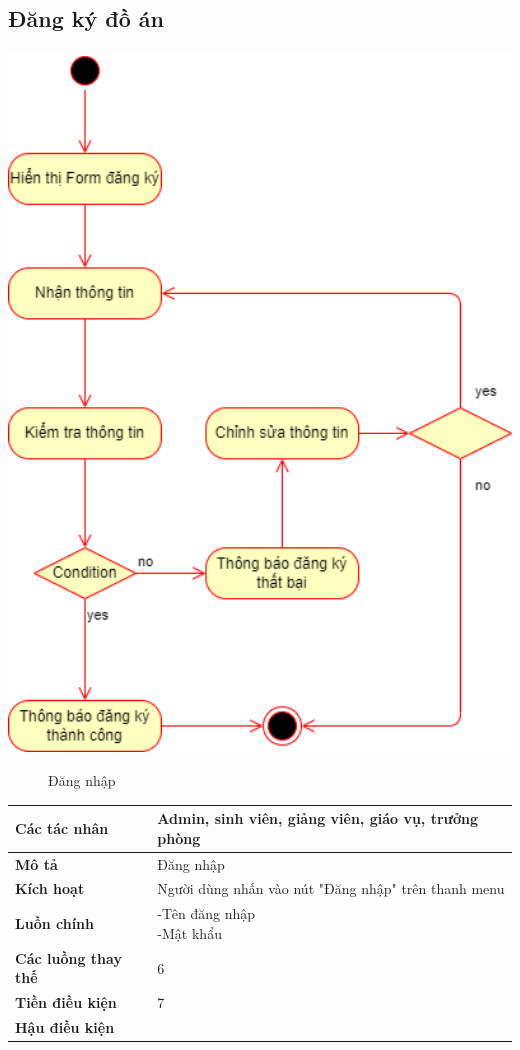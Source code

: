 \subsection{Đăng ký đồ án}
  \begin{center}
    \includegraphics[width=1.1\textwidth]{image/activity/register_doan.png}
    \begin{figure}
      \centering
      \caption{Đăng nhập}
    \end{figure}
  \end{center}
  \begin{table}
    \begin{tabular}{|l|l|}
      \hline
      \textbf{Các tác nhân} & Admin, sinh viên, giảng viên, giáo vụ, trưởng phòng \\
      \hline
      \textbf{Mô tả} & Đăng nhập\\
      \hline
      \textbf{Kích hoạt} & Người dùng nhấn vào nút "Đăng nhập" trên thanh menu \\
      \hline 
      \textbf{Luồn chính} & \makecell[l]{-Tên đăng nhập \\ -Mật khẩu} \\
      \hline
      \textbf{Các luồng thay thế} & 6 \\
      \hline
      \textbf{Tiền điều kiện} & 7 \\
      \hline
      \textbf{Hậu điều kiện} & \\
      \hline
    \end{tabular}
  \end{table}

